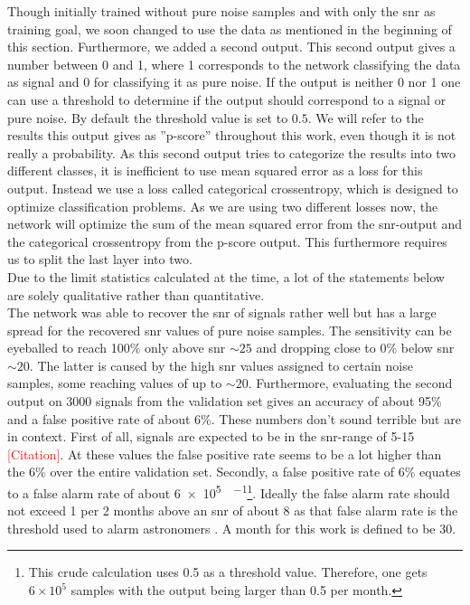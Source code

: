 Though initially trained without pure noise samples and with only the \gls{snr} as training goal, we soon changed to use the data as mentioned in the beginning of this section. Furthermore, we added a second output. This second output gives a number between 0 and 1, where 1 corresponds to the network classifying the data as signal and 0 for classifying it as pure noise. If the output is neither 0 nor 1 one can use a threshold to determine if the output should correspond to a signal or pure noise. By default the threshold value is set to $0.5$. We will refer to the results this output gives as ''p-score'' throughout this work, even though it is not really a probability. As this second output tries to categorize the results into two different classes, it is inefficient to use mean squared error as a loss for this output. Instead we use a loss called categorical crossentropy, which is designed to optimize classification problems. As we are using two different losses now, the network will optimize the sum of the mean squared error from the \gls{snr}-output and the categorical crossentropy from the p-score output. This furthermore requires us to split the last layer into two.\\
Due to the limit statistics calculated at the time, a lot of the statements below are solely qualitative rather than quantitative.\\
The network was able to recover the \gls{snr} of signals rather well but has a large spread for the recovered \gls{snr} values of pure noise samples. The sensitivity can be eyeballed to reach 100\% only above \gls{snr} $\sim 25$ and dropping close to 0\% below \gls{snr} $\sim 20$. The latter is caused by the high \gls{snr} values assigned to certain noise samples, some reaching values of up to $\sim 20$. Furthermore, evaluating the second output on 3000 signals from the validation set gives an accuracy of about 95\% and a false positive rate of about 6\%. These numbers don't sound terrible but are in context. First of all, signals are expected to be in the \gls{snr}-range of 5-15 \textcolor{red}{[Citation]}. At these values the false positive rate seems to be a lot higher than the 6\% over the entire validation set. Secondly, a false positive rate of 6\% equates to a false alarm rate of about \SI[per-mode=fraction]{6e5}{\samples\per\month}\footnote{This crude calculation uses 0.5 as a threshold value. Therefore, one gets $6\times 10^5$ samples with the output being larger than 0.5 per month.}. Ideally the false alarm rate should not exceed 1 per 2 months above an \gls{snr} of about $8$ as that false alarm rate is the threshold used to alarm astronomers \cite{pycbc_live}. A month for this work is defined to be \SI{30}{\days}.\medskip\\
